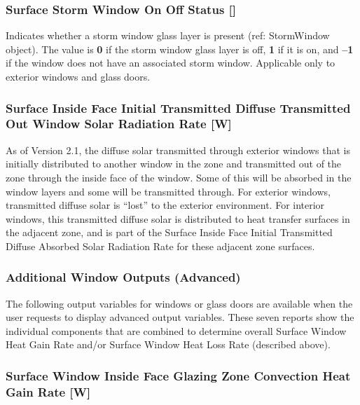 \subsubsection{Surface Storm Window On Off Status {[]}}\label{surface-storm-window-on-off-status}

Indicates whether a storm window glass layer is present (ref: StormWindow object). The value is \textbf{0} if the storm window glass layer is off, \textbf{1} if it is on, and \textbf{--1} if the window does not have an associated storm window. Applicable only to exterior windows and glass doors.

\subsubsection{Surface Inside Face Initial Transmitted Diffuse Transmitted Out Window Solar Radiation Rate {[}W{]}}\label{surface-inside-face-initial-transmitted-diffuse-transmitted-out-window-solar-radiation-rate-w}

As of Version 2.1, the diffuse solar transmitted through exterior windows that is initially distributed to another window in the zone and transmitted out of the zone through the inside face of the window. Some of this will be absorbed in the window layers and some will be transmitted through. For exterior windows, transmitted diffuse solar is ``lost'' to the exterior environment. For interior windows, this transmitted diffuse solar is distributed to heat transfer surfaces in the adjacent zone, and is part of the Surface Inside Face Initial Transmitted Diffuse Absorbed Solar Radiation Rate for these adjacent zone surfaces.

\subsubsection{Additional Window Outputs (Advanced)}\label{additional-window-outputs-advanced}

The following output variables for windows or glass doors are available when the user requests to display advanced output variables. These seven reports show the individual components that are combined to determine overall Surface Window Heat Gain Rate and/or Surface Window Heat Loss Rate (described above).

\subsubsection{Surface Window Inside Face Glazing Zone Convection Heat Gain Rate {[}W{]}}\label{surface-window-inside-face-glazing-zone-convection-heat-gain-rate-w}

